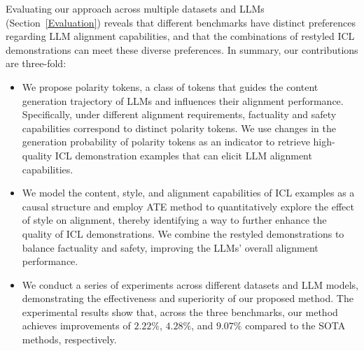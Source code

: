 Evaluating our approach across multiple datasets and LLMs (Section~\ref{Evaluation}) reveals that different benchmarks have distinct preferences regarding LLM alignment capabilities, and that the combinations of restyled ICL demonstrations can meet these diverse preferences. 
%
In summary, our contributions are three-fold:
\begin{itemize}[leftmargin=10pt]
\item We propose polarity tokens, a class of  tokens that guides the content generation trajectory of LLMs and influences their alignment performance. Specifically, under different alignment requirements, factuality and safety capabilities correspond to distinct polarity tokens. We use changes in the generation probability of polarity tokens as an indicator to retrieve high-quality ICL demonstration examples that can elicit LLM alignment capabilities.
\item We model the content, style, and alignment capabilities of ICL examples as a causal structure and employ ATE method to quantitatively explore the effect of style on alignment, thereby identifying a way to further enhance the quality of ICL demonstrations. We combine the restyled demonstrations to balance factuality and safety, improving the LLMs' overall alignment performance.
\item We conduct a series of experiments across different datasets and LLM models, demonstrating the effectiveness and superiority of our proposed method. The experimental results show that, across the three benchmarks, our method achieves improvements of $2.22\%$, $4.28\%$, and $9.07\%$ compared to the SOTA methods, respectively.
\end{itemize}